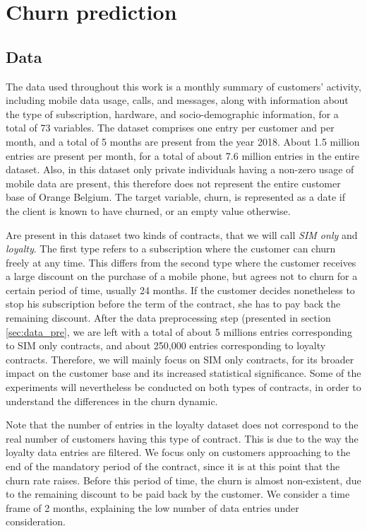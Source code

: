\chapter{Churn prediction}
\label{ch:churn}

\section{Data}
\label{sec:churn_data}

The data used throughout this work is a monthly summary of customers' activity,
including mobile data usage, calls, and messages, along with information about
the type of subscription, hardware, and socio-demographic information, for a
total of 73 variables. The dataset comprises one entry per customer and per
month, and a total of 5 months are present from the year 2018. About 1.5 million
entries are present per month, for a total of about 7.6 million entries in the
entire dataset. Also, in this dataset only private individuals having a non-zero
usage of mobile data are present, this therefore does not represent the entire
customer base of Orange Belgium. The target variable, churn, is represented as a
date if the client is known to have churned, or an empty value otherwise.

Are present in this dataset two kinds of contracts, that we will call \emph{SIM
only} and \emph{loyalty}. The first type refers to a subscription where the
customer can churn freely at any time. This differs from the second type where
the customer receives a large discount on the purchase of a mobile phone, but
agrees not to churn for a certain period of time, usually 24 months. If the
customer decides nonetheless to stop his subscription before the term of the
contract, she has to pay back the remaining discount. After the data
preprocessing step (presented in section \ref{sec:data_pre}, we are left with a
total of about 5 millions entries corresponding to SIM only contracts, and about
250,000 entries corresponding to loyalty contracts. Therefore, we will mainly
focus on SIM only contracts, for its broader impact on the customer base and its
increased statistical significance. Some of the experiments will nevertheless be
conducted on both types of contracts, in order to understand the differences in
the churn dynamic.

Note that the number of entries in the loyalty dataset does not correspond to
the real number of customers having this type of contract. This is due to the
way the loyalty data entries are filtered. We focus only on customers
approaching to the end of the mandatory period of the contract, since it is at
this point that the churn rate raises. Before this period of time, the churn is
almost non-existent, due to the remaining discount to be paid back by the
customer. We consider a time frame of 2 months, explaining the low number of
data entries under consideration.


